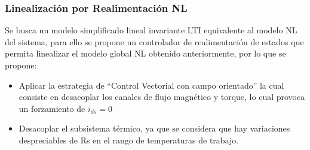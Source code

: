 \documentclass{article}
\begin{document}

\subsubsection*{Linealización por Realimentación NL}

Se busca un modelo simplificado lineal invariante LTI equivalente al modelo NL del sistema, 
para ello se propone un controlador de realimentación de estados que permita linealizar el 
modelo global NL obtenido anteriormente, por lo que se propone:

\begin{itemize}
    \item Aplicar la estrategia de “Control Vectorial con campo orientado” la cual 
    consiste en desacoplar los canales de flujo magnético y torque, lo cual provoca
    un forzamiento de $i_{ds}=0$ 
    \item Desacoplar el subsistema térmico, ya que se considera que hay variaciones despreciables 
    de Rs en el rango de temperaturas de trabajo.
\end{itemize}
\end{document}

